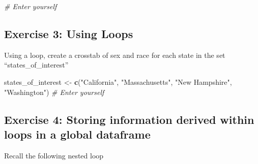\documentclass[]{book}
\newenvironment{Shaded}{\begin{snugshade}}{\end{snugshade}}
\newcommand{\CommentTok}[1]{\textcolor[rgb]{0.56,0.35,0.01}{\textit{#1}}}
\newcommand{\KeywordTok}[1]{\textcolor[rgb]{0.13,0.29,0.53}{\textbf{#1}}}
\newcommand{\NormalTok}[1]{#1}
\newcommand{\StringTok}[1]{\textcolor[rgb]{0.31,0.60,0.02}{#1}}
\theoremstyle{definition}
\theoremstyle{definition}
\theoremstyle{definition}
\theoremstyle{remark}
\begin{document}
\begin{Shaded}
\begin{Highlighting}[]
\CommentTok{# Enter yourself}
\end{Highlighting}
\end{Shaded}

\hypertarget{exercise-3-using-loops}{%
\subsection*{Exercise 3: Using Loops}\label{exercise-3-using-loops}}

Using a loop, create a crosstab of sex and race for each state in the set ``states\_of\_interest''

\begin{Shaded}
\begin{Highlighting}[]
\NormalTok{states_of_interest <-}\StringTok{ }\KeywordTok{c}\NormalTok{(}\StringTok{"California"}\NormalTok{, }\StringTok{"Massachusetts"}\NormalTok{, }\StringTok{"New Hampshire"}\NormalTok{, }\StringTok{"Washington"}\NormalTok{)}
\CommentTok{# Enter yourself}
\end{Highlighting}
\end{Shaded}

\hypertarget{exercise-4-storing-information-derived-within-loops-in-a-global-dataframe}{%
\subsection*{Exercise 4: Storing information derived within loops in a global dataframe}\label{exercise-4-storing-information-derived-within-loops-in-a-global-dataframe}}

Recall the following nested loop
\end{document}
